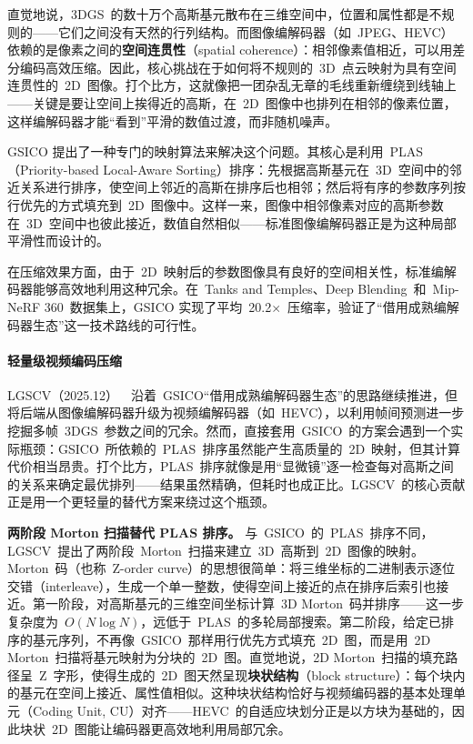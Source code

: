 直觉地说，3DGS~的数十万个高斯基元散布在三维空间中，位置和属性都是不规则的——它们之间没有天然的行列结构。而图像编解码器（如~JPEG、HEVC）依赖的是像素之间的\textbf{空间连贯性}（spatial coherence）：相邻像素值相近，可以用差分编码高效压缩。因此，核心挑战在于如何将不规则的~3D~点云映射为具有空间连贯性的~2D~图像。打个比方，这就像把一团杂乱无章的毛线重新缠绕到线轴上——关键是要让空间上挨得近的高斯，在~2D~图像中也排列在相邻的像素位置，这样编解码器才能``看到''平滑的数值过渡，而非随机噪声。

GSICO 提出了一种专门的映射算法来解决这个问题。其核心是利用~PLAS（Priority-based Local-Aware Sorting）排序：先根据高斯基元在~3D~空间中的邻近关系进行排序，使空间上邻近的高斯在排序后也相邻；然后将有序的参数序列按行优先的方式填充到~2D~图像中。这样一来，图像中相邻像素对应的高斯参数在~3D~空间中也彼此接近，数值自然相似——标准图像编解码器正是为这种局部平滑性而设计的。

在压缩效果方面，由于~2D~映射后的参数图像具有良好的空间相关性，标准编解码器能够高效地利用这种冗余。在~Tanks and Temples、Deep Blending~和~Mip-NeRF 360~数据集上，GSICO 实现了平均~20.2$\times$~压缩率，验证了``借用成熟编解码器生态''这一技术路线的可行性。

\paragraph{轻量级视频编码压缩}

LGSCV（2025.12）~\cite{2512_11186}~沿着~GSICO``借用成熟编解码器生态''的思路继续推进，但将后端从图像编解码器升级为视频编解码器（如~HEVC），以利用帧间预测进一步挖掘多帧~3DGS~参数之间的冗余。然而，直接套用~GSICO~的方案会遇到一个实际瓶颈：GSICO~所依赖的~PLAS~排序虽然能产生高质量的~2D~映射，但其计算代价相当昂贵。打个比方，PLAS~排序就像是用``显微镜''逐一检查每对高斯之间的关系来确定最优排列——结果虽然精确，但耗时也成正比。LGSCV~的核心贡献正是用一个更轻量的替代方案来绕过这个瓶颈。

\textbf{两阶段 Morton 扫描替代 PLAS 排序。}
与~GSICO~的~PLAS~排序不同，LGSCV~提出了两阶段~Morton~扫描来建立~3D~高斯到~2D~图像的映射。Morton~码（也称~Z-order curve）的思想很简单：将三维坐标的二进制表示逐位交错（interleave），生成一个单一整数，使得空间上接近的点在排序后索引也接近。第一阶段，对高斯基元的三维空间坐标计算~3D Morton~码并排序——这一步复杂度为~$O(N \log N)$，远低于~PLAS~的多轮局部搜索。第二阶段，给定已排序的基元序列，不再像~GSICO~那样用行优先方式填充~2D~图，而是用~2D Morton~扫描将基元映射为分块的~2D~图。直觉地说，2D Morton~扫描的填充路径呈~Z~字形，使得生成的~2D~图天然呈现\textbf{块状结构}（block structure）：每个块内的基元在空间上接近、属性值相似。这种块状结构恰好与视频编码器的基本处理单元（Coding Unit, CU）对齐——HEVC~的自适应块划分正是以方块为基础的，因此块状~2D~图能让编码器更高效地利用局部冗余。

